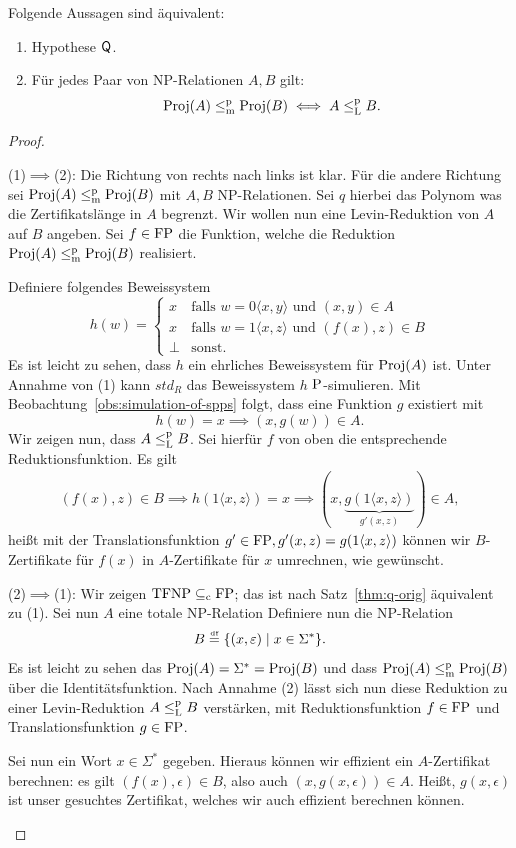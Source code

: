 \begin{theorem}\label{thm:q-as-levin}
    Folgende Aussagen sind äquivalent:
    \begin{enumerate}
        \item Hypothese $\hQ$.
        \item Für jedes Paar von NP-Relationen $A, B$ gilt:
            \[ \Proj(A) \leqmp \Proj(B) \iff A \leqlp B. \]
    \end{enumerate}
\end{theorem}
\begin{proof}
    \begin{prooflist}
\item (1)$\implies$(2): Die Richtung von rechts nach links ist klar. Für die andere Richtung sei $\Proj(A) \leqmp \Proj(B)$ mit $A,B$ NP-Relationen. Sei $q$ hierbei das Polynom was die Zertifikatslänge in $A$ begrenzt.
    Wir wollen nun eine Levin-Reduktion von $A$ auf $B$ angeben. Sei $f\in \FP$ die Funktion, welche die Reduktion $\Proj(A) \leqmp \Proj(B)$ realisiert.

    Definiere folgendes Beweissystem
    \[ h(w) = \begin{cases} x & \text{falls $w=0\langle x, y\rangle$ und $(x,y)\in A$} \\ x & \text{falls $w=1\langle x, z\rangle$ und $(f(x), z)\in B$} \\ \bot & \text{sonst}. \end{cases}\]
    Es ist leicht zu sehen, dass $h$ ein ehrliches Beweissystem für $\Proj(A)$ ist.
    Unter Annahme von (1) kann $\mathit{std}_R$ das Beweissystem $h$ $\P$-simulieren. Mit Beobachtung~\ref{obs:simulation-of-spps} folgt, dass eine Funktion $g$ existiert mit
    \[ h(w)=x\implies (x, g(w))\in A. \]
    Wir zeigen nun, dass $A\leqlp B$. Sei hierfür $f$ von oben die entsprechende Reduktionsfunktion.
    Es gilt
    \begin{gather*}
        (f(x), z)\in B \implies h(1\langle x, z\rangle)=x \implies (x, \underbrace{g(1\langle x, z\rangle)}_{g'(x, z)})\in A,
    \end{gather*}
    heißt mit der Translationsfunktion $g'\in\FP, g'(x,z)=g(1\langle x,z\rangle)$ können wir $B$-Zertifikate für $f(x)$ in $A$-Zertifikate für $x$ umrechnen, wie gewünscht.

\item (2)$\implies$(1): Wir zeigen $\TFNP\subseteqc \FP$; das ist nach Satz~\ref{thm:q-orig} äquivalent zu (1). Sei nun $A$ eine totale NP-Relation
    Definiere nun die NP-Relation
    \[ B \defeq \{ (x, \epsilon) \mid x\in\Sigma^* \}. \]
    Es ist leicht zu sehen das $\Proj(A)=\Sigma^*=\Proj(B)$ und dass $\Proj(A)\leqmp\Proj(B)$ über die Identitätsfunktion.
    Nach Annahme (2) lässt sich nun diese Reduktion zu einer Levin-Reduktion $A\leqlp B$ verstärken, mit Reduktionsfunktion $f\in\FP$ und  Translationsfunktion $g\in\FP$.

    Sei nun ein Wort $x\in\Sigma^*$ gegeben. Hieraus können wir effizient ein $A$-Zertifikat berechnen: es gilt $(f(x),\epsilon)\in B$, also auch $(x, g(x, \epsilon))\in A$. Heißt, $g(x, \epsilon)$ ist unser gesuchtes Zertifikat, welches wir auch effizient berechnen können.
\end{prooflist}
\end{proof}

